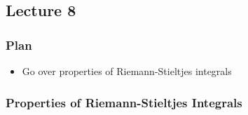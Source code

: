 \subsection{Lecture 8}

\subsubsection{Plan}

\begin{itemize}
    \item Go over properties of Riemann-Stieltjes integrals
\end{itemize}

\subsubsection{Properties of Riemann-Stieltjes Integrals}

